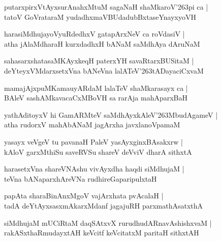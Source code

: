 \documentclass[twoside,12pt,openright]{book}
\def\S{\char'263}
\newcounter{shloka}[chapter]
\begin{document}
\begin{shloka}%
putarxpirxVtAyxsurAnahxMtuM sagaNaH shaMkaroV\S pi ca |\\
tatoV GoVrataraM yudadhxmaVBUdadubBxtaseYnayxyoVH 
\end{shloka}

\begin{shloka}%
harasiMdhujayoVyuRdedhxV gatapArxNeV ca roVdasiV |\\
atha jAlaMdharaH kurxdadhxH bANaM saMdhAya dAruNaM 
\end{shloka}

\begin{shloka}%
sahasarxshatasaMKAyxkeqH paterxYH savaRtarxBUSitaM |\\
deYteyxVMdarxsetxVna bANeVna lalATeV\S tADayaciCxvaM 
\end{shloka}

\begin{shloka}%
mamajAjxpuMKamauyARdaM lalaTeV shaMkarasayx ca |\\
BAleV sashAMkavacaCxMBoVH sa rarAja mahAparxBaH 
\end{shloka}

\begin{shloka}%
yathAditoyxV hi GamARMteV saMdhAyxkAleV\S MbudAgameV |\\
atha rudorxV mahAbANaM jagArxha javxlanoVpamaM 
\end{shloka}

\begin{shloka}%
yasayx veVgeV tu pavanaH PaleV yasAyxginxBAsakxrw |\\
kAloV garxMthiSu saveRVSu shareV deVviV dharA sithxtA 
\end{shloka}

\begin{shloka}%
harasetxVna shareVNAshu vivAyxdha haqdi siMdhujaM |\\
teVna bANaparxhAreVNa rudhireGaparipulxtaH
\end{shloka}

\begin{shloka}%
papAta sharaBinAnxMgoV vajArxhata pvAcalaH |\\
tadA deYtAyxsasxmAkarxMdanf jagajuRH parxmathAsatxthA
\end{shloka}

\begin{shloka}%
siMdhujaM mUCiRtaM daqSAtxvX rurudhudARnavAshishxvaM |\\
rakASxthaRmudayxtAH keVcitf keVcitatxM paritaH sithxtAH
\end{shloka}
\end{document}
